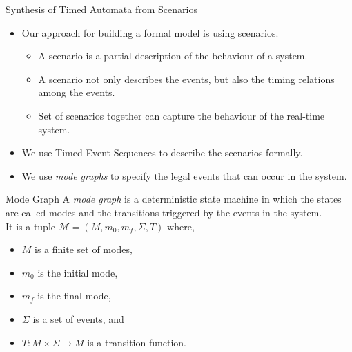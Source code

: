 \documentclass[10pt]{beamer}
\theoremstyle{plain}
\theoremstyle{definition}
\begin{document}
\begin{frame}{Synthesis of Timed Automata from Scenarios}
	\begin{itemize}
		\item {Our approach for building a formal model is using scenarios. 
			\begin{itemize}
				\item A scenario is a partial description of the behaviour of a system.
				\item A scenario not only describes the events, but also the timing relations among the events.
				\item Set of scenarios together can capture the behaviour of the real-time system.
			\end{itemize}
			}
		\item We use Timed Event Sequences to describe the scenarios formally.
		\item We use \emph{mode graphs} to specify the legal events that can occur in the system.
	\end{itemize}	
\end{frame}


\begin{frame}{Mode Graph}
A \emph{mode graph} is a deterministic state machine in which the states are called modes and the transitions triggered by the events in the system. \\
It is a tuple $\mathcal{M} = (M, m_0, m_f, \Sigma, T)$ where,
\begin{itemize}
	\item $M$ is a finite set of modes,
	\item $m_0$ is the initial mode, 
	\item $m_f$ is the final mode, 
	\item $\Sigma$ is a set of events, and 
	\item $T: M\times \Sigma \rightarrow M$ is a
	transition function.
\end{itemize}
\end{frame}
\end{document}
